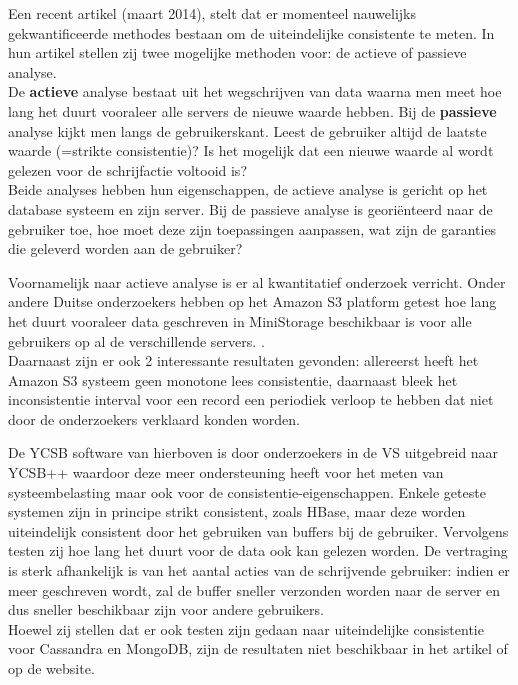 Een recent artikel \cite{golab2014eventually} (maart 2014), stelt dat er momenteel nauwelijks gekwantificeerde methodes bestaan om de uiteindelijke consistente te meten. In hun artikel stellen zij twee mogelijke methoden voor: de actieve of passieve analyse. \\
De \textbf{actieve} analyse bestaat uit het wegschrijven van data waarna men meet hoe lang het duurt vooraleer alle servers de nieuwe waarde hebben. 
Bij de \textbf{passieve} analyse kijkt men langs de gebruikerskant. Leest de gebruiker altijd de laatste waarde (=strikte consistentie)? Is het mogelijk dat een nieuwe waarde al wordt gelezen voor de schrijfactie voltooid is? \\
Beide analyses hebben hun eigenschappen, de actieve analyse is gericht op het database systeem en zijn server. 
Bij de passieve analyse is georiënteerd naar de gebruiker toe, hoe moet deze zijn toepassingen aanpassen, wat zijn de garanties die geleverd worden aan de gebruiker? 

Voornamelijk naar actieve analyse is er al kwantitatief onderzoek verricht. Onder andere Duitse onderzoekers hebben op het Amazon S3 platform getest hoe lang het duurt vooraleer data geschreven in MiniStorage beschikbaar is voor alle gebruikers op al de verschillende servers. \cite{bermbach2011eventual}. \\
Daarnaast zijn er ook 2 interessante resultaten gevonden: allereerst heeft het Amazon S3 systeem geen monotone lees consistentie, daarnaast bleek het inconsistentie interval voor een record een periodiek verloop te hebben dat niet door de onderzoekers verklaard konden worden. 

De YCSB software van hierboven is door onderzoekers in de VS uitgebreid naar YCSB++\cite{patil2011ycsb++} waardoor deze meer ondersteuning heeft voor het meten van systeembelasting maar ook voor de consistentie-eigenschappen. Enkele geteste systemen zijn in principe strikt consistent, zoals HBase, maar deze worden uiteindelijk consistent door het gebruiken van buffers bij de gebruiker. Vervolgens testen zij hoe lang het duurt voor de data ook kan gelezen worden. De vertraging is sterk afhankelijk is van het aantal acties van de schrijvende gebruiker: indien er meer geschreven wordt, zal de buffer sneller verzonden worden naar de server en dus sneller beschikbaar zijn voor andere gebruikers. \\
Hoewel zij stellen dat er ook testen zijn gedaan naar uiteindelijke consistentie voor Cassandra en MongoDB, zijn de resultaten niet beschikbaar in het artikel of op de website. 

